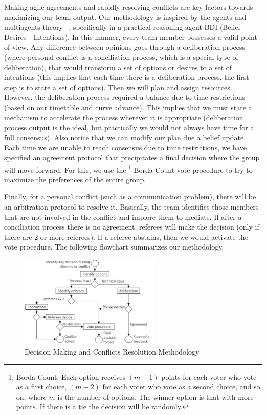 Making agile agreements and rapidly resolving conflicts are key factors towards maximizing our team output. Our methodology is inspired by the agents and multiagents theory ~\cite{BDI}, specifically in a practical reasoning agent BDI (Belief – Desires - Intentions).  In this manner, every team member possesses a valid point of view. Any difference between opinions goes through a deliberation process (where personal conflict is a conciliation process, which is a special type of deliberation), that would transform a set of options or desires to a set of intentions (this implies that each time there is a deliberation process, the first step is to state a set of options). Then we will plan and assign resources. However, the deliberation process required a balance due to time restrictions (based on our timetable and curve advance). This implies that we must state a mechanism to accelerate the process wherever it is appropriate (deliberation process output is the ideal, but practically we would not always have time for a full consensus). Also notice that we can modify our plan due a belief update. 
Each time we are unable to reach consensus due to time restrictions, we have specified an agreement protocol that precipitates a final decision where the group will move forward. For this, we use the \footnote{Borda Count: Each option receives $(m-1)$ points for each voter who vote as a first choice, $(m-2)$ for each voter who vote as a second choice, and so on, where $m$ is the number of options.  The winner option is that with more points. If there is a tie the decision will be randomly.} Borda Count vote procedure to try to maximize the preferences of the entire group.


Finally, for a personal conflict (such as a communication problem), there will be an arbitration protocol to resolve it. Basically, the team identifies those members that are not involved in the conflict and implore them to mediate. If after a conciliation process there is no agreement, referees will make the decision (only if there are 2 or more referees). If a referee abstains, then we would activate the vote procedure. The following flowchart summarizes our methodology.




\begin{figure}[ht]
\centering
\includegraphics[width=0.6\textwidth]{figs/met}
	\caption{Decision Making and Conflicts Resolution Methodology}
	\label{fig:decisions}
\end{figure}



